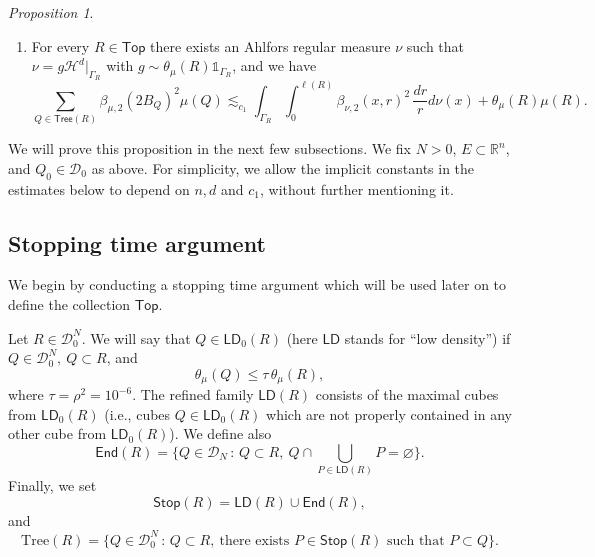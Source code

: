 \documentclass[11pt,reqno]{amsart}
\newcommand{\LD}{\mathsf{LD}}
\newcommand{\Top}{\mathsf{Top}}
\newcommand{\Tr}{\mathrm{Tree}}
\newcommand{\Stop}{\mathsf{Stop}}
\newcommand{\End}{\mathsf{End}}
\def\cC{{\mathscr{C}}}
\def\one{\mathds{1}}
\newcommand{\Tree}{\mathsf{Tree}}
\def\dist{\mathop\mathrm{dist}} 						%
\newcommand{\fr}[2]{\frac{#1}{#2}}
\theoremstyle{definition}
\theoremstyle{remark}
\numberwithin{equation}{section}
\newcommand{\R}{\mathbb{R}}
\newcommand{\DD}{\mathcal{D}}
\theoremstyle{theorem}
\newtheorem{propo}[theorem]{Proposition}
\theoremstyle{definition}
\theoremstyle{remark}
\numberwithin{equation}{section}
\begin{document}
\begin{propo}
\begin{enumerate}
\begin{enumerate}
            \item $E$ is close to $\Gamma_R$ in $2B_R$ in the sense that if $x \in E\cap 2B_R$, then
            \begin{equation*}
                \dist(x, \Gamma_R) \lesssim d_R(x),
            \end{equation*}
            where $d_R(x)$ is as in \eqref{e:d_F}.
            \item The dyadic cubes $I\in\cC_R$ satisfy
				\begin{equation*}
				\ell(I)\sim \inf_{x\in I} d_{R}(x).
				\end{equation*}
        \end{enumerate}
        \item For every $R\in\Top$ there exists an Ahlfors regular measure $\nu$ such that $\nu = g \mathcal{H}^d|_{\Gamma_R}$ with $g\sim \theta_\mu(R)\one_{\Gamma_R}$, and we have
        \begin{equation}\label{eq:betasss}
            \sum_{Q\in\Tree(R)}\beta_{\mu,2}(2B_Q)^2\mu(Q)\lesssim_{c_1} \int_{\Gamma_R}\int_0^{\ell(R)} \beta_{\nu,2}(x,r)^2\, \fr{dr}{r}d\nu(x) + \theta_\mu(R)\mu(R).
        \end{equation}
    \end{enumerate}
\end{propo}
We will prove this proposition in the next few subsections. We fix $N>0$, $E\subset\R^n$, and $Q_0\in\DD_0$ as above. For simplicity, we allow the implicit constants in the estimates below to depend on $n,d$ and $c_1$, without further mentioning it.

	\subsection{Stopping time argument}	
	We begin by conducting a stopping time argument which will be used later on to define the collection $\Top$.
 
	Let $R\in\DD_0^{N}$. We will say that $Q\in\LD_0(R)$ (here $\LD$ stands for ``low density'') if $Q\in \DD_0^N,\ Q\subset R$, and
	\begin{equation*}
	\theta_\mu(Q)\le \tau\,\theta_\mu(R),
	\end{equation*}
	where $\tau = \rho^2 = 10^{-6}$. The refined family $\LD(R)$ consists of the maximal cubes from $\LD_0(R)$ (i.e., cubes $Q\in\LD_0(R)$ which are not properly contained in any other cube from $\LD_0(R)$). 
 We define also
	\begin{equation*}
	\End(R) = \big\{Q\in\DD_N\,:\, Q\subset R,\ Q\cap \bigcup_{P\in\LD(R)}P = \varnothing \big\}.
	\end{equation*}
	Finally, we set 
	\begin{equation*}
	\Stop(R) = \LD(R)\cup \End(R),
	\end{equation*}
	and
	\begin{equation*}
	\Tr(R) = \{Q\in\DD_0^N\, :\, Q\subset R,\ \text{there exists $P\in\Stop(R)$ such that } P\subset Q \}.
	\end{equation*}
	
\end{document}
